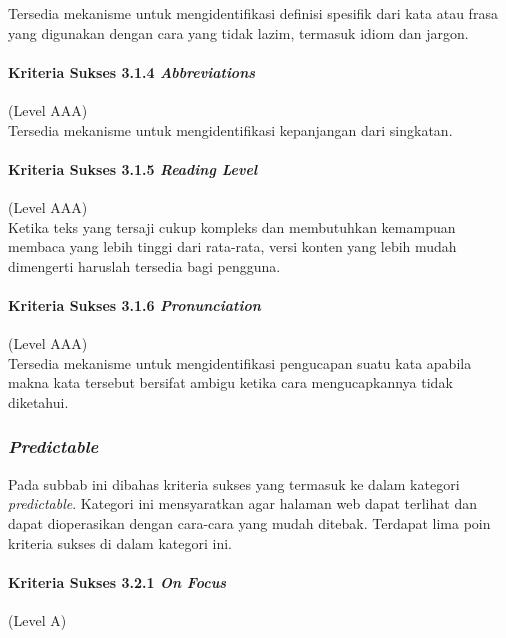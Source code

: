 Tersedia mekanisme untuk mengidentifikasi definisi spesifik dari kata atau frasa yang digunakan dengan cara yang tidak lazim, termasuk idiom dan jargon.

\paragraph{Kriteria Sukses 3.1.4 \textit{Abbreviations}}
\label{sec:kriteria_sukses_3.1.4}
(Level AAA)\\

Tersedia mekanisme untuk mengidentifikasi kepanjangan dari singkatan.

\paragraph{Kriteria Sukses 3.1.5 \textit{Reading Level}}
\label{sec:kriteria_sukses_3.1.5}
(Level AAA)\\

Ketika teks yang tersaji cukup kompleks dan membutuhkan kemampuan membaca yang lebih tinggi dari rata-rata, versi konten yang lebih mudah dimengerti haruslah tersedia bagi pengguna.

\paragraph{Kriteria Sukses 3.1.6 \textit{Pronunciation}}
\label{sec:kriteria_sukses_3.1.6}
(Level AAA)\\

Tersedia mekanisme untuk mengidentifikasi pengucapan suatu kata apabila makna kata tersebut bersifat ambigu ketika cara mengucapkannya tidak diketahui.

\subsubsection{\textit{Predictable}}
\label{sec:predictable}
Pada subbab ini dibahas kriteria sukses yang termasuk ke dalam kategori \textit{predictable}. Kategori ini mensyaratkan agar halaman web dapat terlihat dan dapat dioperasikan dengan cara-cara yang mudah ditebak. Terdapat lima poin kriteria sukses di dalam kategori ini.

\paragraph{Kriteria Sukses 3.2.1 \textit{On Focus}}
\label{sec:kriteria_sukses_3.2.1}
(Level A)\\

